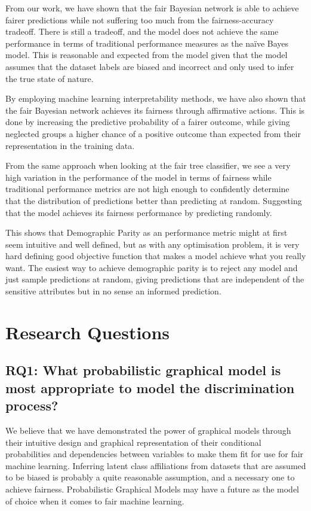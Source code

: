 From our work, we have shown that the fair Bayesian network is able to achieve fairer predictions while not suffering too much from the fairness-accuracy tradeoff. There is still a tradeoff, and the model does not achieve the same performance in terms of traditional performance measures as the naïve Bayes model. This is reasonable and expected from the model given that the model assumes that the dataset labels are biased and incorrect and only used to infer the true state of nature. 

By employing machine learning interpretability methods, we have also shown that the fair Bayesian network achieves its fairness through affirmative actions. This is done by increasing the predictive probability of a fairer outcome, while giving neglected groups a higher chance of a positive outcome than expected from their representation in the training data.

From the same approach when looking at the fair tree classifier, we see a very high variation in the performance of the model in terms of fairness while traditional performance metrics are not high enough to confidently determine that the distribution of predictions better than predicting at random. Suggesting that the model achieves its fairness performance by predicting randomly. 

This shows that Demographic Parity as an performance metric might at first seem intuitive and well defined, but as with any optimisation problem, it is very hard defining good objective function that makes a model achieve what you really want. The easiest way to achieve demographic parity is to reject any model and just sample predictions at random, giving predictions that are independent of the sensitive attributes but in no sense an informed prediction.

\section{Research Questions}

\subsection{RQ1: What probabilistic graphical model is most appropriate to model the discrimination process?}

We believe that we have demonstrated the power of graphical models through their intuitive design and graphical representation of their conditional probabilities and dependencies between variables to make them fit for use for fair machine learning. Inferring latent class affiliations from datasets that are assumed to be biased is probably a quite reasonable assumption, and a necessary one to achieve fairness. Probabilistic Graphical Models may have a future as the model of choice when it comes to fair machine learning.

